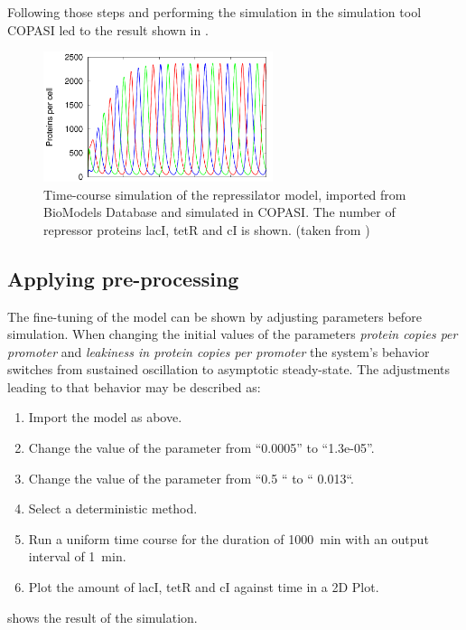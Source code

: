 Following those steps and performing the simulation in the simulation tool COPASI \citep{Hoops:2006} led to the result shown in . 

\begin{figure}
\centering
\includegraphics[width=0.6\textwidth]{examples/simEx1.png}
\caption{Time-course simulation of the repressilator model, imported from BioModels Database and simulated in COPASI. The number of repressor proteins lacI, tetR and cI is shown. (taken from \citep{Waltemath:2011})}
\label{fig:simEx1}
\end{figure}

\subsection{Applying pre-processing}
\label{sec:examplePreprocessing}
The fine-tuning of the model can be shown by adjusting parameters before simulation. When changing the initial values of the parameters \emph{protein copies per promoter} and \emph{leakiness in protein copies per promoter} the system's behavior switches from sustained oscillation to asymptotic steady-state. The adjustments leading to that behavior may be described as: 

\begin{enumerate}
\item{Import the model as above.}
\item{Change the value of the parameter  from “0.0005” to “1.3e-05”. }
\item{Change the value of the parameter  from “0.5 “ to “ 0.013“.}
\item{Select a deterministic method.}
\item{Run a uniform time course for the duration of 1000~min with an output interval of 1~min.}
\item Plot the amount of lacI, tetR and cI against time in a 2D Plot.
\end{enumerate}

 shows the result of the simulation.

